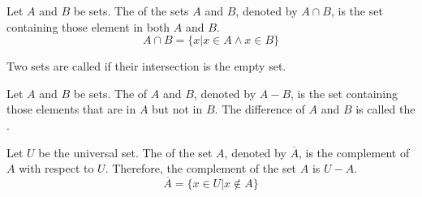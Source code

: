             \par Let $A$ and $B$ be sets. The  of the sets $A$ and $B$, denoted
            by $A \cap B$, is the set containing those element in both $A$ and $B$.
            \begin{equation}
                A \cap B = \{x | x \in A \land x \in B\}
            \end{equation}
            \par Two sets are called  if their intersection is the empty set.

            \par Let $A$ and $B$ be sets. The  of $A$ and $B$, denoted by $A - B$,
            is the set containing those elements that are in $A$ but not in $B$. The difference of
            $A$ and $B$ is called the .

            \par Let $U$ be the universal set. The  of the set $A$, denoted by
            $\overline{A}$, is the complement of $A$ with respect to $U$. Therefore, the
            complement of the set $A$ is $U - A$.
            \begin{equation}
                \overline{A} = \{x \in U | x \not \in A\}
            \end{equation}

